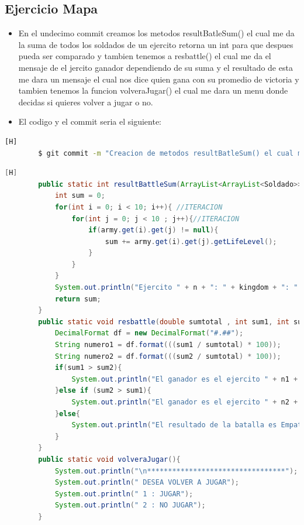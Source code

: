 \documentclass{article}
\begin{document}
	\subsection{Ejercicio Mapa}
	\begin{itemize}	
		\item En el undecimo commit creamos los metodos resultBatleSum() el cual me da la suma de todos los soldados de un ejercito retorna un int para que despues pueda ser comparado y tambien tenemos a resbattle() el cual me da el mensaje de el jercito ganador dependiendo de su suma y el resultado de esta me dara un mensaje el cual nos dice quien gana con su promedio de victoria y tambien tenemos la funcion volveraJugar() el cual me dara un menu donde decidas si quieres volver a jugar o no.
		\item El codigo y el commit seria el siguiente:
	\end{itemize}	
	\begin{lstlisting}[language=bash,caption={Commit}][H]
		$ git commit -m "Creacion de metodos resultBatleSum() el cual me da la suma de todos los soldados de un ejercito retorna un int para que despues pueda ser comparado y tambien tenemos a resbattle() el cual me da el mensaje de el jercito ganador dependiendo de su suma y el resultado de esta me dara un mensaje el cual nos dice quien gana con su promedio de victoria y tambien tenemos la funcion volveraJugar() el cual me dara un menu donde decidas si quieres volver a jugar o no"
	\end{lstlisting}	
	\begin{lstlisting}[language=java,caption={Las lineas de codigos de la clase Mapa creada:}][H]
		public static int resultBattleSum(ArrayList<ArrayList<Soldado>> army, String kingdom, int n){
			int sum = 0;
			for(int i = 0; i < 10; i++){ //ITERACION
				for(int j = 0; j < 10 ; j++){//ITERACION
					if(army.get(i).get(j) != null){
						sum += army.get(i).get(j).getLifeLevel();
					}
				}
			}
			System.out.println("Ejercito " + n + ": " + kingdom + ": " + sum);
			return sum;
		}
		public static void resbattle(double sumtotal , int sum1, int sum2 , int n1, int n2 , String kingdom1, String kingdom2){
			DecimalFormat df = new DecimalFormat("#.##");
			String numero1 = df.format(((sum1 / sumtotal) * 100));
			String numero2 = df.format(((sum2 / sumtotal) * 100));
			if(sum1 > sum2){
				System.out.println("El ganador es el ejercito " + n1 + " de: " + kingdom1 +". Ya que al generar los porcentajes de probabilidad de victoria basada en los niveles de vida de sus soldados y aplicando un experimento aleatorio salió vencedor. (Aleatorio generado : "+ numero1 + ")");
			}else if (sum2 > sum1){
				System.out.println("El ganador es el ejercito " + n2 + " de: " + kingdom2 +". Ya que al generar los porcentajes de probabilidad de victoria basada en los niveles de vida de sus soldados y aplicando un experimento aleatorio salió vencedor. (Aleatorio generado : "+ numero2 + ")");
			}else{
				System.out.println("El resultado de la batalla es Empate");
			}
		}
		public static void volveraJugar(){
			System.out.println("\n*********************************");
			System.out.println(" DESEA VOLVER A JUGAR");
			System.out.println(" 1 : JUGAR");
			System.out.println(" 2 : NO JUGAR");
		}
	\end{lstlisting}
\end{document}
